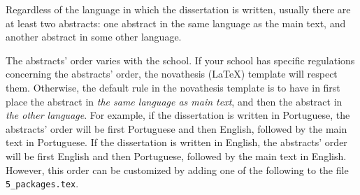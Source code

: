 
%

Regardless of the language in which the dissertation is written, usually there are at least two abstracts: 
one abstract in the same language as the main text, and another abstract in some other language.

The abstracts' order varies with the school. If your school has specific regulations concerning the abstracts' 
order, the \gls{novathesis} (\LaTeX) template will respect them.  Otherwise, the default rule in the 
\gls{novathesis} template is to have in first place the abstract in \emph{the same language as main text}, 
and then the abstract in \emph{the other language}. For example, if the dissertation is written in Portuguese, 
the abstracts' order will be first Portuguese and then English, followed by the main text in Portuguese. If 
the dissertation is written in English, the abstracts' order will be first English and then Portuguese, 
followed by the main text in English.
%
However, this order can be customized by adding one of the following to the file \verb+5_packages.tex+.


